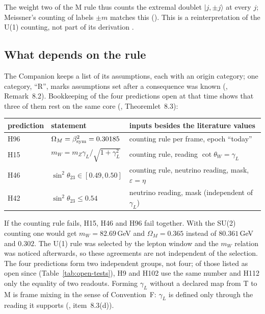 The weight two of the M rule thus counts the extremal doublet $|j,\pm j\rangle$ at every $j$; Meissner's counting of labels $\pm m$ matches this
\cite{Meissner2004} ().  This is a reinterpretation of the U(1) counting, not part of its derivation \Reading.

\subsection{What depends on the rule}
\label{sec:beta-dependence}

The Companion keeps a list of its assumptions, each with an origin category; one category, ``R'', marks assumptions set after a consequence was known
(, Remark~8.2).  Bookkeeping of the four predictions open at that time shows that three of them rest on the same core (, Theoremlet~8.3):

\begin{center}\small
\begin{tabular}{@{}lll@{}}
\toprule
prediction & statement & inputs besides the literature values\\
\midrule
H96 & $\Omega_M=\beta_{\mathrm{sym}}^2=0.30185$ & counting rule per frame, epoch ``today''\\
H15 & $m_W=m_Z\gamma_L/\sqrt{1+\gamma_L^2}$ & counting rule, reading $\cot\theta_W=\gamma_L$\\
H46 & $\sin^2\theta_{23}\in[0.49,0.50]$ & counting rule, neutrino reading, mask, $\varepsilon=\eta$\\
H42 & $\sin^2\theta_{23}\le0.54$ & neutrino reading, mask (independent of $\gamma_L$)\\
\bottomrule
\end{tabular}
\end{center}

If the counting rule fails, H15, H46 and H96 fail together.  With the SU(2) counting one would get $m_W=82.69$\,GeV and $\Omega_M=0.365$
instead of $80.361$\,GeV and $0.302$.  The U(1) rule was selected by the lepton window and the $m_W$ relation was noticed afterwards, so these
agreements are not independent of the selection.  The four predictions form two independent groups, not four; of those listed as open since
(Table~\ref{tab:open-tests}), H9 and H102 use the same number and H112 only the equality of two readouts.  Forming $\gamma_L$ without
a declared map from T to M is frame mixing in the sense of Convention~F: $\gamma_L$ is defined only through the reading it supports
(, item~8.3(d)).

